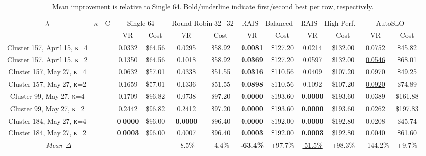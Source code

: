 \documentclass{article}
\begin{document}
\begin{table}[t]
\centering
\footnotesize
\setlength{\tabcolsep}{2.5pt}
\caption{Mean improvement is relative to Single 64. Bold/underline indicate first/second best per row, respectively.}\label{tab:todo}
\begin{tabular}{c c c || c c | c c | c c | c c | c c}
\toprule
$\lambda$ & $\kappa$ & C & \multicolumn{2}{c|}{Single 64} & \multicolumn{2}{c|}{Round Robin 32+32} & \multicolumn{2}{c|}{RAIS - Balanced} & \multicolumn{2}{c|}{RAIS - High Perf.} & \multicolumn{2}{c}{AutoSLO} \\
 &  &  & VR & Cost & VR & Cost & VR & Cost & VR & Cost & VR & Cost \\
\hline
Cluster 157, April 15, κ=4 &  &  & 0.0332 & \$64.56 & 0.0295 & \$58.92 & \textbf{0.0081} & \$127.20 & \underline{0.0214} & \$132.00 & 0.0752 & \$45.82 \\
Cluster 157, April 15, κ=2 &  &  & 0.1350 & \$64.56 & 0.1018 & \$58.92 & \textbf{0.0369} & \$127.20 & 0.0597 & \$132.00 & \underline{0.0546} & \$68.01 \\
Cluster 157, May 27, κ=4 &  &  & 0.0632 & \$57.01 & \underline{0.0338} & \$51.55 & \textbf{0.0316} & \$110.56 & 0.0409 & \$107.20 & 0.0970 & \$49.25 \\
Cluster 157, May 27, κ=2 &  &  & 0.1659 & \$57.01 & 0.1336 & \$51.55 & \textbf{0.0898} & \$110.56 & 0.1092 & \$107.20 & \underline{0.0920} & \$74.89 \\
Cluster 99, May 27, κ=4 &  &  & 0.1709 & \$96.82 & 0.0738 & \$97.20 & \textbf{0.0000} & \$193.60 & \textbf{0.0000} & \$193.60 & 0.0389 & \$161.88 \\
Cluster 99, May 27, κ=2 &  &  & 0.2442 & \$96.82 & 0.2412 & \$97.20 & \textbf{0.0000} & \$193.60 & \textbf{0.0000} & \$193.60 & 0.0262 & \$197.83 \\
Cluster 184, May 27, κ=4 &  &  & \textbf{0.0000} & \$96.00 & \textbf{0.0000} & \$96.40 & \textbf{0.0000} & \$192.00 & \textbf{0.0000} & \$192.80 & 0.0208 & \$45.74 \\
Cluster 184, May 27, κ=2 &  &  & \textbf{0.0003} & \$96.00 & 0.0007 & \$96.40 & \textbf{0.0003} & \$192.00 & \textbf{0.0003} & \$192.80 & 0.0040 & \$61.60 \\
\hline
\multicolumn{3}{c||}{\textit{Mean~$\Delta$}} & --- & --- & -8.5\% & -4.4\% & \textbf{-63.4\%} & +97.7\% & \underline{-51.5\%} & +98.3\% & +144.2\% & +9.7\% \\
\bottomrule
\end{tabular}
\end{table}
\end{document}
